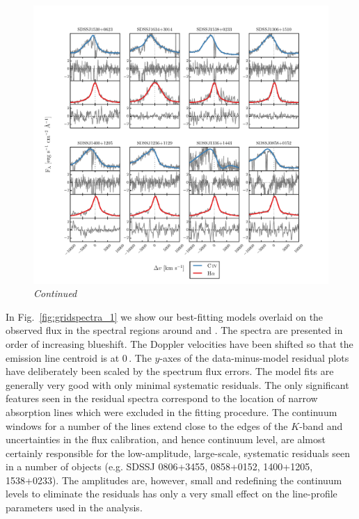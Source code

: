\renewcommand{\thefigure}{\arabic{figure}}
\addtocounter{figure}{-1}
\begin{figure}
	\includegraphics[width=\columnwidth]{figures/chapter02/gridspectra_2.pdf}
    \caption{\it Continued}
    \label{fig:gridspectra_2}
\end{figure}
\renewcommand{\thefigure}{\arabic{figure}}

In Fig.~\ref{fig:gridspectra_1} we show our best-fitting models overlaid on the observed flux in the spectral regions around  and \hans. 
The spectra are presented in order of increasing  blueshift. 
The Doppler velocities have been shifted so that the \ha emission line centroid is at 0\,\kms. 
The $y$-axes of the data-minus-model residual plots have deliberately been scaled by the spectrum flux errors.
The model fits are generally very good with only minimal systematic residuals. 
The only significant features seen in the residual  spectra correspond to the location of narrow absorption lines which were excluded in the fitting procedure.
The continuum windows for a number of the \ha lines extend close to the edges of the $K$-band and uncertainties in the flux calibration, and hence continuum level, are almost certainly responsible for the low-amplitude, large-scale, systematic residuals seen in a number of objects (e.g. SDSSJ 0806+3455, 0858+0152, 1400+1205, 1538+0233). 
The amplitudes are, however, small and redefining the continuum levels to eliminate the residuals has only a very small effect on the line-profile parameters used in the analysis. 

